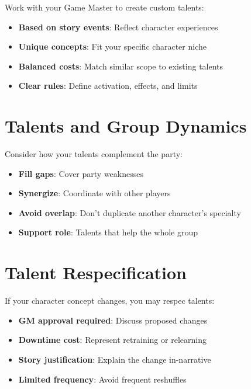 Work with your Game Master to create custom talents:
\begin{itemize}
\item \textbf{Based on story events}: Reflect character experiences
\item \textbf{Unique concepts}: Fit your specific character niche
\item \textbf{Balanced costs}: Match similar scope to existing talents
\item \textbf{Clear rules}: Define activation, effects, and limits
\end{itemize}

\section{Talents and Group Dynamics}

Consider how your talents complement the party:
\begin{itemize}
\item \textbf{Fill gaps}: Cover party weaknesses
\item \textbf{Synergize}: Coordinate with other players
\item \textbf{Avoid overlap}: Don't duplicate another character's specialty
\item \textbf{Support role}: Talents that help the whole group
\end{itemize}

\section{Talent Respecification}

If your character concept changes, you may respec talents:
\begin{itemize}
\item \textbf{GM approval required}: Discuss proposed changes
\item \textbf{Downtime cost}: Represent retraining or relearning
\item \textbf{Story justification}: Explain the change in-narrative
\item \textbf{Limited frequency}: Avoid frequent reshuffles
\end{itemize}

